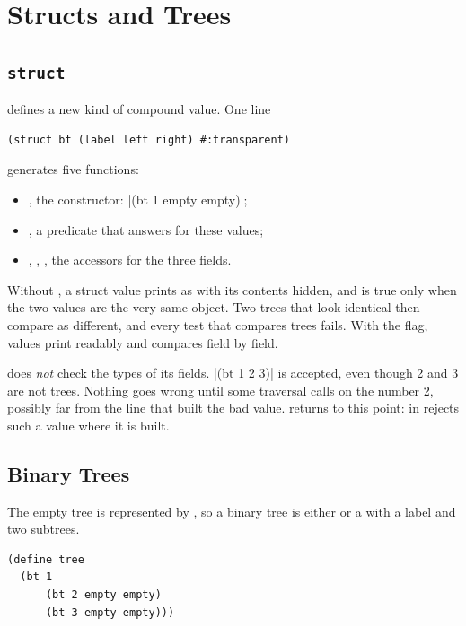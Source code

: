 \section{Structs and Trees}
\label{sec:structs}

\subsection{\texttt{struct}}

 defines a new kind of compound value. One line
\begin{lstlisting}
(struct bt (label left right) #:transparent)
\end{lstlisting}
generates five functions:
\begin{itemize}
  \item {}, the constructor: \rkt|(bt 1 empty empty)|;
  \item {}, a predicate that answers  for these values;
  \item {}, , , the accessors for the three fields.
\end{itemize}

\begin{pitfall}
Without , a struct value prints as  with its contents hidden, and  is true only when the two values are the very same object. Two trees that look identical then compare as different, and every test that compares trees fails. With the flag, values print readably and  compares field by field.
\end{pitfall}

 does \emph{not} check the types of its fields. \rkt|(bt 1 2 3)| is accepted, even though 2 and 3 are not trees. Nothing goes wrong until some traversal calls  on the number 2, possibly far from the line that built the bad value.  returns to this point:  in  rejects such a value where it is built.

\subsection{Binary Trees}

The empty tree is represented by , so a binary tree is either  or a  with a label and two subtrees.
\begin{lstlisting}
(define tree
  (bt 1
      (bt 2 empty empty)
      (bt 3 empty empty)))
\end{lstlisting}

